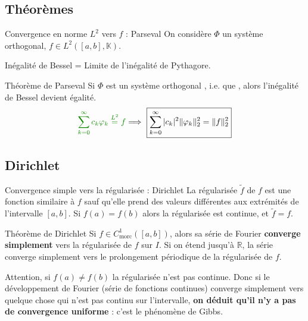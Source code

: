 \documentclass[9pt]{beamer}
\newcommand\serie{\sum_{k=0} ^\infty}
\newcommand\serieck{\sum_{k=0} ^\infty c_k \varphi_k}
\newcommand\carrab{L^2([a,b], \mathbb{K})}
\begin{document}
\subsection{Théorèmes}
\begin{frame}{Convergence en norme $L^2$ vers $f$ : Parseval}
On considère $\Phi$ un système orthogonal, $f \in \carrab$.
\begin{block}{Inégalité de Bessel}
= Limite de l'inégalité de Pythagore.
\begin{center}\boxmath{\serie |c_k|^2 \|\varphi_k \|_2 ^2 \leq \|f\|_2 ^2}
\end{center}
\end{block}
\begin{block}{Théorème de Parseval}
Si $\Phi$ est un système orthogonal \textbf{}, i.e. que , alors l'inégalité de Bessel devient égalité.
$$ \green{\serieck \stackrel{L^2}{=} f}  \Longrightarrow  \ \boxed{\serie |c_k|^2 \|\varphi_k \|_2 ^2 = \|f\|_2 ^2}$$
\end{block}
\end{frame}
\subsection{Dirichlet}
\begin{frame}{Convergence simple vers la régularisée : Dirichlet}
La régularisée $\tilde{f}$ de $f$ est une fonction similaire à $f$ sauf qu'elle prend des valeurs différentes aux extrémités de l'intervalle $[a,b]$. Si $f(a) = f(b)$ alors la régularisée est continue, et $\tilde{f} = f$.
\begin{block}{Théorème de Dirichlet}
Si $f\in C^1 _{\text{morc}} ([a,b])$, alors sa série de Fourier \textbf{converge simplement} vers la régularisée de $f$ sur $I$. Si on étend jusqu'à $\mathbb{R}$, la série converge simplement vers le prolongement périodique de la régularisée de $f$. 
\end{block}
Attention, si $f(a) \neq f(b)$ la régularisée n'est pas continue. Donc si le développement de Fourier (série de fonctions continues) converge simplement vers quelque chose qui n'est pas continu sur l'intervalle, \textbf{on déduit qu'il n'y a pas de convergence uniforme} : c'est le phénomène de Gibbs.
\end{frame}
\end{document}

